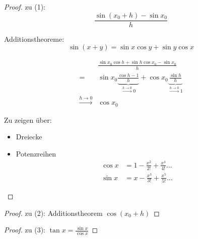 \begin{proof}
 zu (1):
\begin{equation*}
	\frac{\sin (x_0 + h) - \sin x_0}{h}
\end{equation*}

Additionstheoreme:
\begin{equation*}
\sin(x+y) = \sin x \cos y + \sin y \cos x
\end{equation*}

\begin{align*}
	&\frac{\sin x_0 \cos h + \sin h \cos x_0 - \sin x_0}{h} \\
	= &\sin x_0 \underbrace{\frac{\cos h - 1}{h}}_{\xrightarrow{h \rightarrow 0} 0} + \cos x_0 \underbrace{\frac{\sin h}{h}}_{\xrightarrow{h \rightarrow 0} 1} \\
	\xrightarrow{h \rightarrow 0} &\cos x_0
\end{align*}

Zu zeigen über:
\begin{itemize}
	\item Dreiecke
	\item Potenzreihen
		\begin{align*}
			\cos x &= 1 - \frac{x^2}{2!} + \frac{x^4}{4!} \dots \\
			\sin x &= x - \frac{x^3}{3!} + \frac{x^5}{5!} \dots
		\end{align*}
\end{itemize}
\end{proof}

\begin{proof}
zu (2): Additionstheorem $\cos (x_0 + h)$
\end{proof}
\begin{proof}
zu (3): $ \tan x = \frac{\sin x}{\cos x} $
\end{proof}

